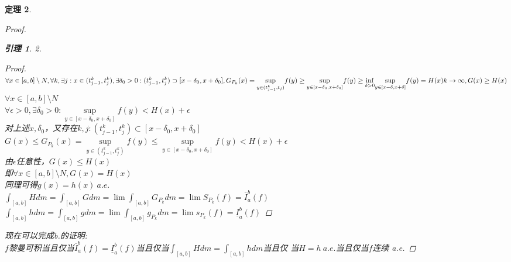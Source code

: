 \documentclass[12pt, a4paper, oneside]{ctexbook}
\newtheorem{theorem}{定理}[section]
\newtheorem{lemma}[theorem]{引理}
\begin{document}
\begin{theorem}
\begin{proof}
\begin{lemma}{2.}
\begin{proof}
                $\forall x\in[a,b]\setminus N,\forall k,\exists j:x\in(t_{j-1}^k,t_j^k),\exists \delta_0>0:(t_{j-1}^k,t_j^k)\supset [x-\delta_0,x+
                \delta_0],G_{P_k}(x)=\underset{y\in(t_{j-1}^k,t_j)}{\sup}f(y)\geq\underset{y\in[x-\delta_0,x+\delta_0]}{\sup}f(y)\geq \underset{\delta>0}{\inf}\underset{y\in[x-\delta,x+\delta]}{\sup}f(y)=H(x)
                \\k\to\infty,G(x)\geq H(x)$
                \\$\forall x\in[a,b]\setminus N$
                \\$\forall \epsilon>0,\exists \delta_0>0:\underset{y\in[x-\delta_0,x+\delta_0]}{\sup}f(y)<H(x)+\epsilon$
                \\对上述$x,\delta_0$，又存在$k,j:(t_{j-1}^k,t_j^k)\subset[x-\delta_0,x+\delta_0]$
                \\$G(x)\leq G_{P_k}(x)=\underset{y\in(t_{j-1}^k,t_j^k)}{\sup}f(y)\leq\underset{y\in[x-\delta_0,x+\delta_0]}{\sup}f(y)<H(x)+\epsilon$
                \\由$\epsilon$任意性，$G(x)\leq H(x)$
                \\即$\forall x\in[a,b]\setminus N,G(x)=H(x)$
                \\同理可得$g(x)=h(x)\ a.e.$
                \\$\int_{[a,b]}Hdm=\int_{[a,b]}Gdm=\lim\int_{[a,b]}G_{P_k}dm=\lim S_{P_k}(f)=\overline{I}_a^b(f)$
                \\$\int_{[a,b]}hdm=\int_{[a,b]}gdm=\lim\int_{[a,b]}g_{P_k}dm=\lim s_{P_k}(f)=\underline{I}_a^b(f)$
            \end{proof}
        \end{lemma}
    现在可以完成b.的证明:
    \\$f$黎曼可积当且仅当$\overline{I}_a^b(f)=\underline{I}_a^b(f)$当且仅当$\int_{[a,b]}Hdm=\int_{[a,b]}hdm$当且仅
    当$H=h\ a.e.$当且仅当$f$连续 a.e.
    \end{proof}
\end{theorem}
\end{document}
